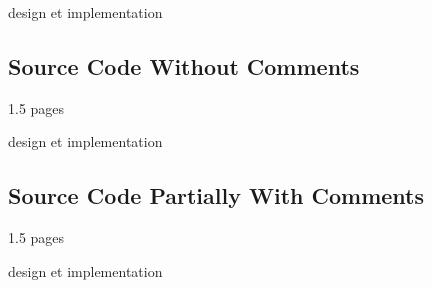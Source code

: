 design et implementation

\subsection{Source Code Without Comments}

1.5 pages


design et implementation

\subsection{Source Code Partially With Comments}

1.5 pages


design et implementation


